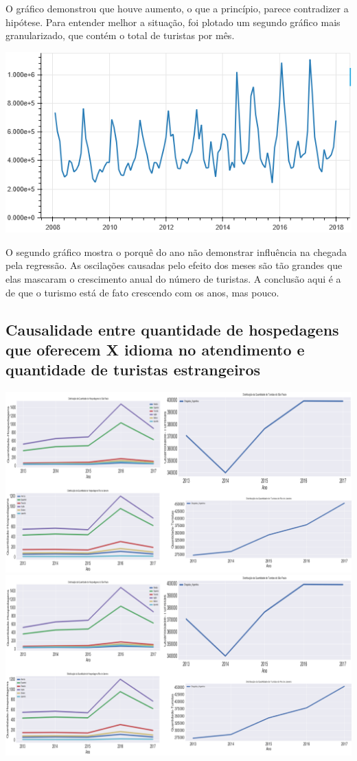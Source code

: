 \documentclass[review]{elsarticle}
\begin{document}
O gráfico demonstrou que houve aumento, o que a princípio, parece contradizer a hipótese. Para entender melhor a situação, foi plotado um segundo gráfico mais granularizado, que contém o total de turistas por mês.

\includegraphics[width=\textwidth]{Segment-Tourist-Month}

O segundo gráfico mostra o porquê do ano não demonstrar influência na chegada pela regressão. As oscilações causadas pelo efeito dos meses são tão grandes que elas mascaram o crescimento anual do número de turistas. A conclusão aqui é a de que o turismo está de fato crescendo com os anos, mas pouco.

\subsection{Causalidade entre quantidade de hospedagens que oferecem X idioma no atendimento e quantidade de turistas estrangeiros}

\includegraphics[width=\textwidth]{Segment-Host-Tourist}
\includegraphics[width=\textwidth]{Segment-Host-Tourist-2}
\end{document}
